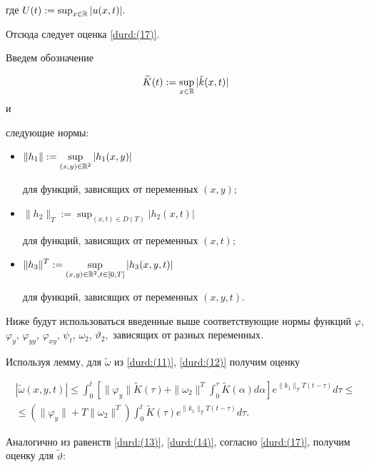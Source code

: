 где $U(t):=\sup_{x\in {\Bbb R}}|u(x,t)|.$

Отсюда следует оценка \eqref{durd:(17)}. 



Введем обозначение

$$\widetilde{K}(t):=\sup_{x\in {\Bbb R}}|\tilde{k}(x,t)|$$ и

следующие нормы: 

\begin{itemize}

\item[--]

$\displaystyle \|h_1\|:=\sup_{(x,y)\in {\Bbb R}^2}|h_1(x,y)|$

для функций, зависящих от переменных $(x,y)$; 

\item[--] $\displaystyle \|h_2\|_T:=\sup_{(x,t)\in D(T)}|h_2(x,t)|$

для функций, зависящих от переменных $(x,t)$; 

\item[--]

 $\displaystyle \|h_3\|^T:=\sup_{(x,y)\in {\Bbb R}^2, t\in [0, T]}|h_3(x,y,t)|$

для функций, зависящих от переменных $(x,y,t)$.

\end{itemize}

Ниже будут использоваться введенные выше   соответствующие нормы функций $\varphi$, $\varphi_y$, $\varphi_{yy}$, $\varphi_{xy}$, $\psi_t$, $\omega_2$, $\vartheta_2,$ зависящих от разных переменных.



Используя лемму, для $\widetilde{\omega}$ из \eqref{durd:(11)}, \eqref{durd:(12)} получим оценку

\begin{multline}

\label{durd:(18)}

|\widetilde{\omega}(x,y,t)|\leq\int^{t}_{0}\left[\|\varphi_{y}\|\widetilde{K}(\tau)+\|\omega_{2}\|^{T}\int^{\tau}_{0}\widetilde{K}(\alpha)d\alpha\right]e^{\|k_{1}\|_{T}T(t-\tau)}d\tau\leq \\

\leq(\|\varphi_{y}\|+T\|\omega_{2}\|^{T})\int^{t}_{0}\widetilde{K}(\tau)e^{\|k_{1}\|_{T}T(t-\tau)}d\tau. 

\end{multline}

Аналогично из равенств \eqref{durd:(13)}, \eqref{durd:(14)},  согласно \eqref{durd:(17)},  получим оценку для $\widetilde{\vartheta}$:

